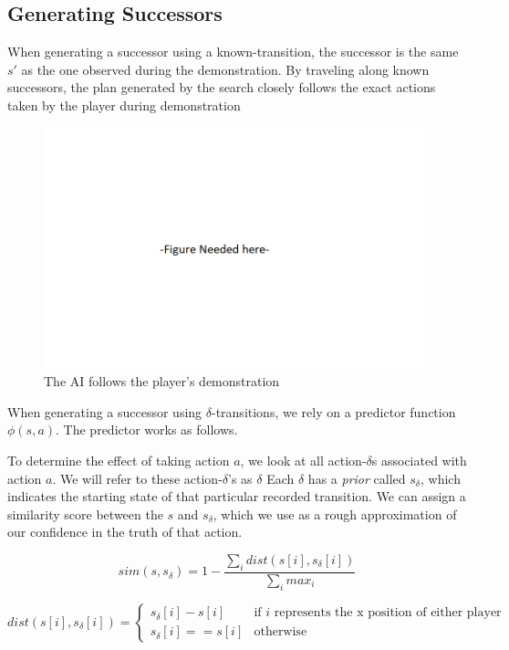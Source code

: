 \subsection{Generating Successors}

When generating a successor using a known-transition, the successor is the same $s'$ as the one observed during the demonstration. By traveling along known successors, the plan generated by the search closely follows the exact actions taken by the player during demonstration

\begin{figure}[h]
	\centering
	\includegraphics[width=\textwidth]{Figures/Placeholder.png}
	\caption{The AI follows the player's demonstration}
	\label{followdemonstration}
\end{figure}

When generating a successor using $\delta$-transitions, we rely on a predictor function $\phi(s,a)$. The predictor works as follows.

To determine the effect of taking action $a$, we look at all action-$\delta$s associated with action $a$. We will refer to these action-$\delta$'s as $\delta$ Each $\delta$ has a \textit{prior} called $s_{\delta}$, which indicates the starting state of that particular recorded transition. We can assign a similarity score between the $s$ and $s_{\delta}$, which we use as a rough approximation of our confidence in the truth of that action.

$$sim(s, s_{\delta}) = 1-\frac{\sum_i dist(s[i], s_{\delta}[i])}{\sum_i max_i}$$

$$dist(s[i], s_{\delta}[i]) =
\begin{cases}
s_{\delta}[i] - s[i] & \text{if $i$ represents the x position of either player} \\
s_{\delta}[i] == s[i] & \text{otherwise}
\end{cases}
$$


